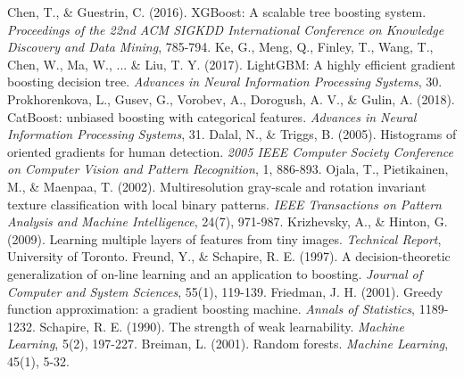 \documentclass[UTF8]{report}
\theoremstyle{MyLineTheoremStyle} %
\theoremstyle{MyBlockTheoremStyle} %
\theoremstyle{MySubsubsectionStyle} %
\begin{document}
\begin{thebibliography}{99}
     Chen, T., \& Guestrin, C. (2016). XGBoost: A scalable tree boosting system. \textit{Proceedings of the 22nd ACM SIGKDD International Conference on Knowledge Discovery and Data Mining}, 785-794.
     Ke, G., Meng, Q., Finley, T., Wang, T., Chen, W., Ma, W., ... \& Liu, T. Y. (2017). LightGBM: A highly efficient gradient boosting decision tree. \textit{Advances in Neural Information Processing Systems}, 30.
     Prokhorenkova, L., Gusev, G., Vorobev, A., Dorogush, A. V., \& Gulin, A. (2018). CatBoost: unbiased boosting with categorical features. \textit{Advances in Neural Information Processing Systems}, 31.
     Dalal, N., \& Triggs, B. (2005). Histograms of oriented gradients for human detection. \textit{2005 IEEE Computer Society Conference on Computer Vision and Pattern Recognition}, 1, 886-893.
     Ojala, T., Pietikainen, M., \& Maenpaa, T. (2002). Multiresolution gray-scale and rotation invariant texture classification with local binary patterns. \textit{IEEE Transactions on Pattern Analysis and Machine Intelligence}, 24(7), 971-987.
     Krizhevsky, A., \& Hinton, G. (2009). Learning multiple layers of features from tiny images. \textit{Technical Report}, University of Toronto.
     Freund, Y., \& Schapire, R. E. (1997). A decision-theoretic generalization of on-line learning and an application to boosting. \textit{Journal of Computer and System Sciences}, 55(1), 119-139.
     Friedman, J. H. (2001). Greedy function approximation: a gradient boosting machine. \textit{Annals of Statistics}, 1189-1232.
     Schapire, R. E. (1990). The strength of weak learnability. \textit{Machine Learning}, 5(2), 197-227.
     Breiman, L. (2001). Random forests. \textit{Machine Learning}, 45(1), 5-32.
\end{thebibliography}


\newpage
\end{document}
